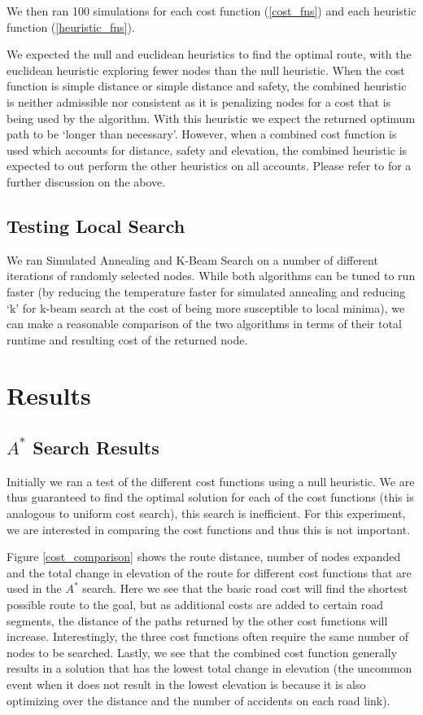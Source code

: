 \documentclass[11pt]{article}
\begin{document}
\par
We then ran 100 simulations for each cost function (\ref{cost_fns}) and each heuristic function (\ref{heuristic_fns}). 

We expected the null and euclidean heuristics to find the optimal route, with the euclidean heuristic exploring fewer nodes than the null heuristic. When the cost function is simple distance or simple distance and safety, the combined heuristic is neither admissible nor consistent as it is penalizing nodes for a cost that is being used by the algorithm. With this heuristic we expect the returned optimum path to be `longer than necessary'. However, when a combined cost function is used which accounts for distance, safety and elevation, the combined heuristic is expected to out perform the other heuristics on all accounts. Please refer to  for a further discussion on the above.

\subsection{Testing Local Search}

We ran Simulated Annealing and K-Beam Search on a number of different iterations of randomly selected nodes. While both algorithms can be tuned to run faster (by reducing the temperature faster for simulated annealing and reducing `k' for k-beam search at the cost of being more susceptible to local minima), we can make a reasonable comparison of the two algorithms in terms of their total runtime and resulting cost of the returned node.

\section{Results}\label{results}

\subsection{$A^{*}$ Search Results}
Initially we ran a test of the different cost functions using a null heuristic. We are thus guaranteed to find the optimal solution for each of the cost functions (this is analogous to uniform cost search), this search is inefficient. For this experiment, we are interested in comparing the cost functions and thus this is not important.
\par

Figure \ref{cost_comparison} shows the route distance, number of nodes expanded and the total change in elevation of the route for different cost functions that are used in the $A^{*}$ search. Here we see that the basic road cost will find the shortest possible route to the goal, but as additional costs are added to certain road segments, the distance of the paths returned by the other cost functions will increase. Interestingly, the three cost functions often require the same number of nodes to be searched. Lastly, we see that the combined cost function generally results in a solution that has the lowest total change in elevation (the uncommon event when it does not result in the lowest elevation is because it is also optimizing over the distance and the number of accidents on each road link).
\end{document}
